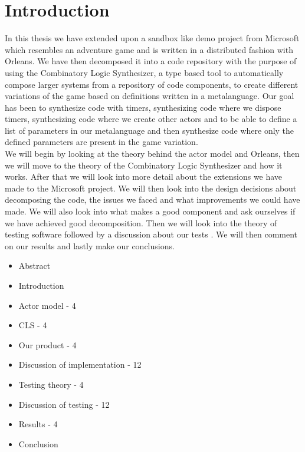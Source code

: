\section{Introduction}
In this thesis we have extended upon a sandbox like demo project from Microsoft \cite{AdventureGame} which resembles an adventure game and is written in a distributed fashion with Orleans. We have then decomposed it into a code repository with the  purpose of using the Combinatory Logic Synthesizer, a type based tool to automatically compose larger systems from a repository of code components, to create different variations of the game based on definitions written in a metalanguage. Our goal has been to synthesize code with timers, synthesizing code where we dispose timers, synthesizing code where we create other actors and to be able to define a list of parameters in our metalanguage and then synthesize code where only the defined parameters are present in the game variation. \\
We will begin by looking at the theory behind the actor model and Orleans, then we will move to the theory of the Combinatory Logic Synthesizer and how it works. After that we will look into more detail about the extensions we have made to the Microsoft project. We will then look into the design decisions about decomposing the code, the issues we faced and what improvements we could have made. We will also look into what makes a good component and ask ourselves if we have achieved good decomposition. Then we will look into the theory of testing software followed by a discussion about our tests . We will then comment on our results and lastly make our conclusions.
\begin{itemize}
	\item Abstract
	\item Introduction
	\item Actor model - 4
	\item CLS - 4
	\item Our product - 4
	\item Discussion of implementation - 12
	\item Testing theory - 4
	\item Discussion of testing - 12
	\item Results - 4
	\item Conclusion
\end{itemize}